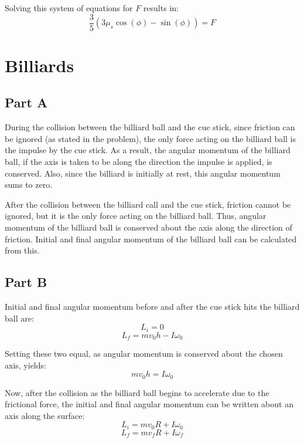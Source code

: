 \documentclass{article}
\begin{document}
Solving this system of equations for $F$ results in:
$$ \frac{ 3 }{ 5 } \left( 3 \mu_{s} \cos \left( \phi \right) - \sin \left( \phi
\right) \right) = F$$

\section{ Billiards }

\subsection*{ Part A }

During the collision between the billiard ball and the cue stick, since friction
can be ignored (as stated in the problem), the only force acting on the billiard
ball is the impulse by the cue stick. As a result, the angular momentum of the
billiard ball, if the axis is taken to be along the direction the impulse is
applied, is conserved. Also, since the billiard is initially at rest, this
angular momentum sums to zero.

After the collision between the billiard call and the cue stick, friction cannot
be ignored, but it is the only force acting on the billiard ball. Thus, angular
momentum of the billiard ball is conserved about the axis along the direction of
friction. Initial and final angular momentum of the billiard ball can be
calculated from this.

\subsection*{ Part B }

Initial and final angular momentum before and after the cue stick hits the
billiard ball are:
$$ L_{i} = 0 $$
$$ L_{f} = mv_{0}h - I\omega_{0} $$

Setting these two equal, as angular momentum is conserved about the chosen axis,
yields:
\begin{equation} 
    mv_{0}h = I\omega_{0} 
\end{equation}

Now, after the collision as the billiard ball begins to accelerate due to the
frictional force, the initial and final angular momentum can be written about an
axis along the surface:
\begin{equation} 
    L_{i} = mv_{0}R + I\omega_{0} 
\end{equation}
\begin{equation} 
    L_{f} = mv_{f}R + I\omega_{f} 
\end{equation}
\end{document}
